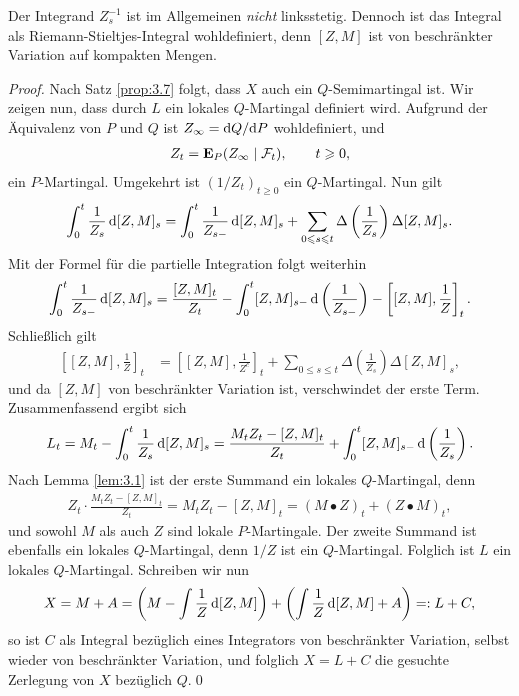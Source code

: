 \begin{rem*}
Der Integrand $Z_s^{-1}$ ist im Allgemeinen \textit{nicht} linksstetig. Dennoch
ist das Integral als Riemann-Stieltjes-Integral wohldefiniert, denn $[Z,M]$ ist
von beschränkter Variation auf kompakten Mengen.\map
\end{rem*}

\begin{proof}
Nach Satz \ref{prop:3.7} folgt, dass $X$ auch ein $Q$-Semimartingal ist. Wir
zeigen nun, dass durch $L$ ein lokales $Q$-Martingal definiert wird.
Aufgrund der Äquivalenz von $P$ und $Q$ ist $Z_\infty = \mathrm{d} Q/\mathrm{d} P$ wohldefiniert,
und
\begin{align*}
Z_t = \mathbf{E}_P(Z_\infty\mid\mathcal{F}_t),\qquad t \geqslant 0,
\end{align*}
ein $P$-Martingal. Umgekehrt ist $(1/Z_t)_{t\ge 0}$ ein $Q$-Martingal. Nun gilt 
\begin{align*}
\int_0^t \frac{1}{Z_s}\, \mathrm{d}[Z,M]_s
=
\int_0^t \frac{1}{Z_{s-}}\, \mathrm{d}[Z,M]_s
+
\sum_{0\leqslant s \leqslant t} \Delta \left(\frac{1}{Z_s}\right) \Delta [Z,M]_s.
\end{align*}
Mit der Formel für die partielle Integration folgt weiterhin
\begin{align*}
\int_0^t \frac{1}{Z_{s-}}\, \mathrm{d}[Z,M]_s
=
\frac{[Z,M]_t}{Z_t} -
\int_0^t [Z,M]_{s-}\,\mathrm{d}\left(\frac{1}{Z_{s-}}\right)
- \left[[Z,M],\frac{1}{Z}\right]_t.
\end{align*}
Schließlich gilt
\begin{align*}
\left[[Z,M],\frac{1}{Z}\right]_t &= \left[[Z,M],\frac{1}{Z^c}\right]_t + 
\sum_{0\le s \le t}\Delta \left(\frac{1}{Z_s}\right) \Delta [Z,M]_s, 
\end{align*}
und da $[Z,M]$ von beschränkter Variation ist, verschwindet der erste Term.
Zusammenfassend ergibt sich
\begin{align*}
L_t = M_t - \int_0^t \frac{1}{Z_s}\, \mathrm{d}[Z,M]_s = 
\frac{M_tZ_t - [Z,M]_t}{Z_t} +
\int_0^t [Z,M]_{s-}\,\mathrm{d}\left(\frac{1}{Z_{s}}\right).
\end{align*}
Nach Lemma \ref{lem:3.1} ist der erste Summand ein lokales $Q$-Martingal,
denn
\begin{align*}
Z_t\cdot \frac{M_tZ_t - [Z,M]_t}{Z_t} = 
M_tZ_t - [Z,M]_t = (M\bullet Z)_t + (Z\bullet M)_t,
\end{align*}
und sowohl $M$ als auch $Z$ sind lokale $P$-Martingale. Der zweite Summand
ist ebenfalls ein lokales $Q$-Martingal, denn $1/Z$ ist ein
$Q$-Martingal. Folglich ist $L$ ein lokales $Q$-Martingal. Schreiben wir nun
\begin{align*}
X = M+ A = \left(M - \int \frac{1}{Z}\,\mathrm{d}[Z,M]\right)
+
\left(\int \frac{1}{Z}\,\mathrm{d}[Z,M] + A\right)
=: L + C,
\end{align*}
so ist $C$ als Integral bezüglich eines Integrators von beschränkter
Variation, selbst wieder von beschränkter Variation, und folglich $X = L+C$ die
gesuchte Zerlegung von $X$ bezüglich $Q$.\qed
\end{proof}

